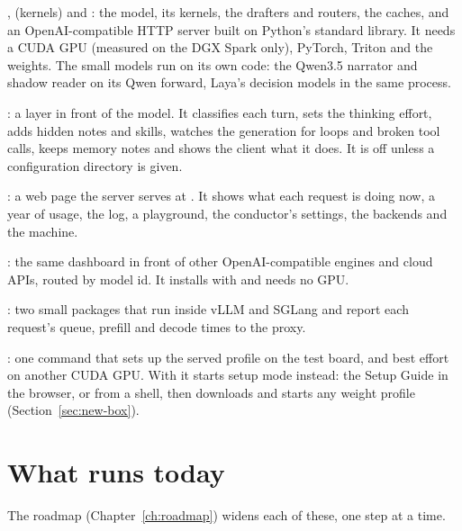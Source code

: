 \begin{description}[style=nextline]
\item[The engine] ,  (kernels) and : the model, its kernels, the drafters and routers, the caches, and an OpenAI-compatible HTTP server built on Python's standard library. It needs a CUDA GPU (measured on the DGX Spark only), PyTorch, Triton and the weights. The small models run on its own code: the Qwen3.5 narrator and shadow reader on its Qwen forward, Laya's decision models in the same process.
\item[The conductor] : a layer in front of the model. It classifies each turn, sets the thinking effort, adds hidden notes and skills, watches the generation for loops and broken tool calls, keeps memory notes and shows the client what it does. It is off unless a configuration directory is given.
\item[The dashboard] : a web page the server serves at . It shows what each request is doing now, a year of usage, the log, a playground, the conductor's settings, the backends and the machine.
\item[The proxy] : the same dashboard in front of other OpenAI-compatible engines and cloud APIs, routed by model id. It installs with  and needs no GPU.
\item[The plugins] : two small packages that run inside vLLM and SGLang and report each request's queue, prefill and decode times to the proxy.
\item[The installer] : one command that sets up the served profile on the test board, and best effort on another CUDA GPU. With  it starts setup mode instead: the Setup Guide in the browser, or  from a shell, then downloads and starts any weight profile (Section~\ref{sec:new-box}).
\end{description}

\section{What runs today}

The roadmap (Chapter~\ref{ch:roadmap}) widens each of these, one step at a time.

